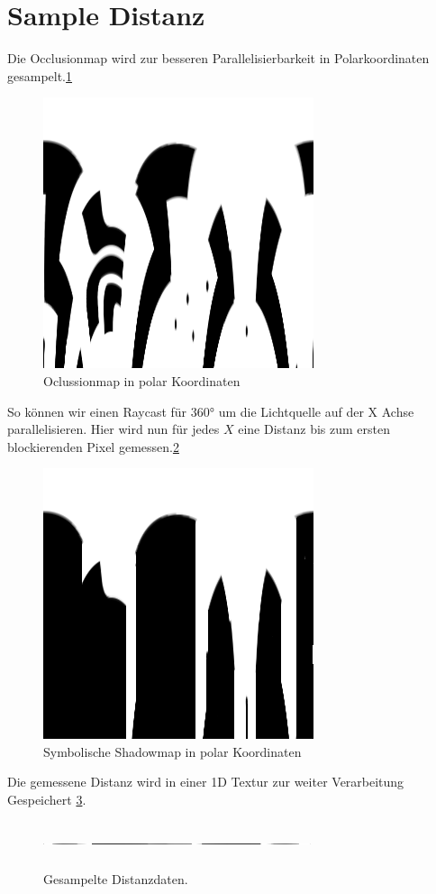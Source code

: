 \section{Sample Distanz}
Die Occlusionmap wird zur besseren Parallelisierbarkeit in Polarkoordinaten gesampelt.\ref{o_2}\\
\begin{figure}
	\centering
	\includegraphics{images/oclusion_polar_2.png}
	\caption{Oclussionmap in polar Koordinaten}
	\label{o_2}
\end{figure}
 So können wir einen Raycast für $360°$ um die Lichtquelle auf der X Achse parallelisieren. Hier wird nun für jedes $X$ eine Distanz bis zum ersten blockierenden Pixel gemessen.\ref{o_3}
\begin{figure}
	\centering
	\includegraphics{images/shadow_polar_2.png}
	\caption{Symbolische Shadowmap in polar Koordinaten}
	\label{o_3}
\end{figure}
Die gemessene Distanz wird in einer 1D Textur zur weiter Verarbeitung Gespeichert \ref{o_4}.
\begin{figure}
	\centering
	\includegraphics[width=0.7\textwidth,height=50px]{images/1DTexture.png}
	\caption{Gesampelte Distanzdaten.}
	\label{o_4}
\end{figure}
